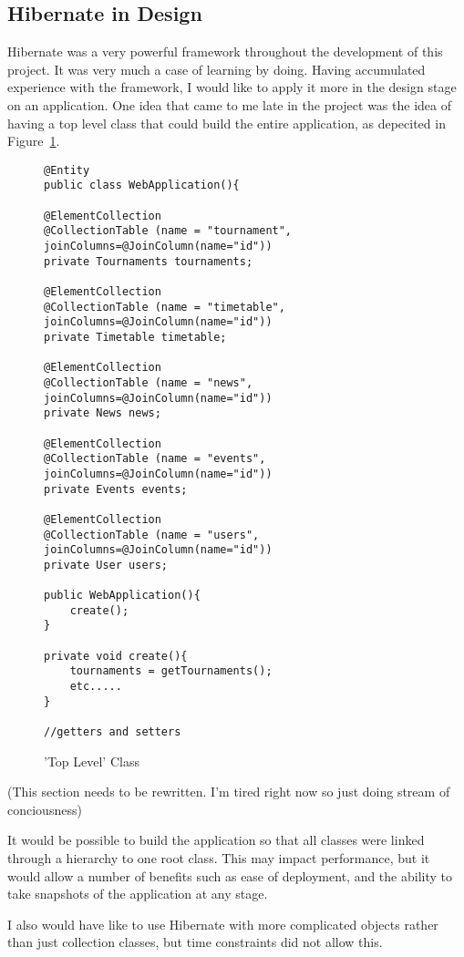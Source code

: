 \subsection{Hibernate in Design}
Hibernate was a very powerful framework throughout the development of this project. It was very much a case of learning by doing. Having accumulated experience with the framework, I would like to apply it more in the design stage on an application. One idea that came to me late in the project was the idea of having a top level class that could build the entire application, as depecited in Figure~\ref{fig:toplevel}.

\begin{figure}[H]
\begin{lstlisting}
@Entity
public class WebApplication(){

@ElementCollection
@CollectionTable (name = "tournament", joinColumns=@JoinColumn(name="id"))
private Tournaments tournaments;

@ElementCollection
@CollectionTable (name = "timetable", joinColumns=@JoinColumn(name="id"))
private Timetable timetable;

@ElementCollection
@CollectionTable (name = "news", joinColumns=@JoinColumn(name="id"))
private News news;

@ElementCollection
@CollectionTable (name = "events", joinColumns=@JoinColumn(name="id"))
private Events events;

@ElementCollection
@CollectionTable (name = "users", joinColumns=@JoinColumn(name="id"))
private User users;

public WebApplication(){
	create();
}

private void create(){
	tournaments = getTournaments();
	etc.....
}

//getters and setters

\end{lstlisting}
\caption{'Top Level' Class}
\label{fig:toplevel}
\end{figure}

(This section needs to be rewritten. I'm tired right now so just doing stream of conciousness) 

It would be possible to build the application so that all classes were linked through a hierarchy to one root class. This may impact performance, but it would allow a number of benefits such as ease of deployment, and the ability to take snapshots of the application at any stage.

I also would have like to use Hibernate with more complicated objects rather than just collection classes, but time constraints did not allow this.

